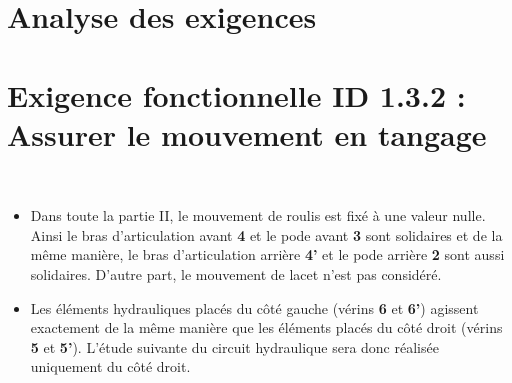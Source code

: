 \section{Analyse des exigences \label{sec:1}}
\ifprof
\begin{corrige}
\end{corrige}
\else
\fi



\section{Exigence fonctionnelle ID 1.3.2 : Assurer le mouvement en tangage \label{sec:2}}
\ifprof
\else
\begin{hypo}~\\
\begin{itemize}
\item Dans toute la partie II, le mouvement de roulis est fixé à une valeur nulle. Ainsi le bras d’articulation avant \textbf{4} et le pode avant \textbf{3} sont solidaires et de la même manière, le bras d’articulation arrière \textbf{4’} et le pode arrière \textbf{2} sont aussi solidaires. D’autre part, le mouvement de lacet n’est pas considéré.
\item Les éléments hydrauliques placés du côté gauche (vérins \textbf{6} et \textbf{6’}) agissent exactement de la même manière que les éléments placés du côté droit (vérins \textbf{5} et \textbf{5’}). L’étude suivante du circuit hydraulique sera donc réalisée uniquement du côté droit.
\end{itemize}
\end{hypo}
\fi

